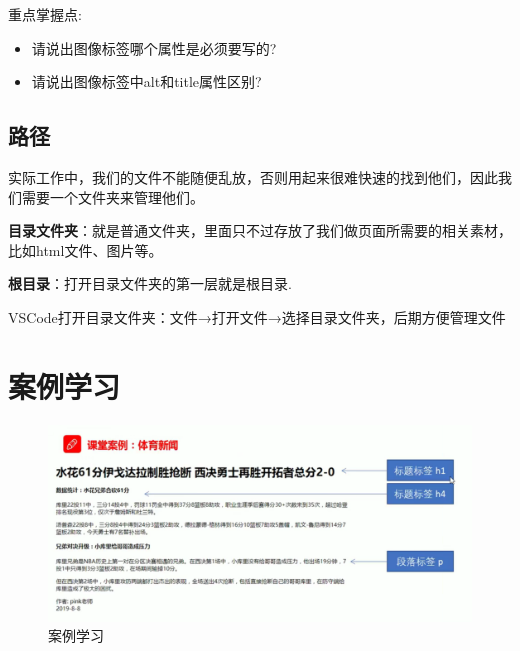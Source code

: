 \documentclass[
]{book}
\providecommand{\tightlist}{%
  \setlength{\itemsep}{0pt}\setlength{\parskip}{0pt}}
\begin{document}
重点掌握点:

\begin{itemize}
\tightlist
\item
  请说出图像标签哪个属性是必须要写的?
\item
  请说出图像标签中alt和title属性区别?
\end{itemize}

\hypertarget{ux8defux5f84}{%
\subsection{路径}\label{ux8defux5f84}}

实际工作中，我们的文件不能随便乱放，否则用起来很难快速的找到他们，因此我们需要一个文件夹来管理他们。

\textbf{目录文件夹}：就是普通文件夹，里面只不过存放了我们做页面所需要的相关素材，比如html文件、图片等。

\textbf{根目录}：打开目录文件夹的第一层就是根目录.

VSCode打开目录文件夹：文件→打开文件→选择目录文件夹，后期方便管理文件

\hypertarget{ux6848ux4f8bux5b66ux4e60}{%
\section{案例学习}\label{ux6848ux4f8bux5b66ux4e60}}

\begin{figure}

{\centering \includegraphics{fig/1-7} 

}

\caption{案例学习}\label{fig:unnamed-chunk-10}
\end{figure}
\end{document}
